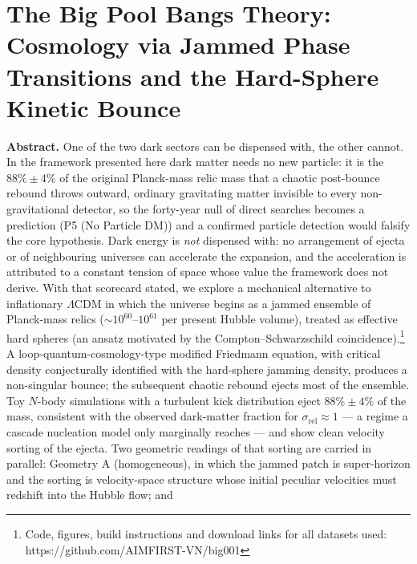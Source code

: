 \documentclass[
]{article}
\author{}
\date{}
\begin{document}
\hypertarget{the-big-pool-bangs-theory-cosmology-via-jammed-phase-transitions-and-the-hard-sphere-kinetic-bounce}{%
\section{\texorpdfstring{\textbf{The Big Pool Bangs Theory: Cosmology
via Jammed Phase Transitions and the Hard-Sphere Kinetic
Bounce}}{The Big Pool Bangs Theory: Cosmology via Jammed Phase Transitions and the Hard-Sphere Kinetic Bounce}}\label{the-big-pool-bangs-theory-cosmology-via-jammed-phase-transitions-and-the-hard-sphere-kinetic-bounce}}

\textbf{Abstract.} One of the two dark sectors can be dispensed with,
the other cannot. In the framework presented here dark matter needs no
new particle: it is the \(88\% \pm 4\%\) of the original Planck-mass
relic mass that a chaotic post-bounce rebound throws outward, ordinary
gravitating matter invisible to every non-gravitational detector, so the
forty-year null of direct searches becomes a prediction (P5 (No Particle
DM)) and a confirmed particle detection would falsify the core
hypothesis. Dark energy is \emph{not} dispensed with: no arrangement of
ejecta or of neighbouring universes can accelerate the expansion, and
the acceleration is attributed to a constant tension of space whose
value the framework does not derive. With that scorecard stated, we
explore a mechanical alternative to inflationary \(\Lambda\)CDM in which
the universe begins as a jammed ensemble of Planck-mass relics
(\(\sim\!10^{60}\)--\(10^{61}\) per present Hubble volume), treated as
effective hard spheres (an ansatz motivated by the
Compton--Schwarzschild coincidence).\footnote{Code, figures, build
  instructions and download links for all datasets used:
  https://github.com/AIMFIRST-VN/big001} A loop-quantum-cosmology-type
modified Friedmann equation, with critical density conjecturally
identified with the hard-sphere jamming density, produces a non-singular
bounce; the subsequent chaotic rebound ejects most of the ensemble. Toy
\(N\)-body simulations with a turbulent kick distribution eject
\(88\% \pm 4\%\) of the mass, consistent with the observed dark-matter
fraction for \(\sigma_{\text{rel}} \approx 1\) --- a regime a cascade
nucleation model only marginally reaches --- and show clean velocity
sorting of the ejecta. Two geometric readings of that sorting are
carried in parallel: Geometry A (homogeneous), in which the jammed patch
is super-horizon and the sorting is velocity-space structure whose
initial peculiar velocities must redshift into the Hubble flow; and
\end{document}
